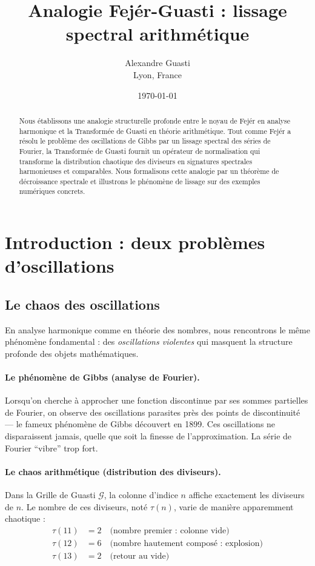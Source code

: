 \documentclass[12pt,a4paper]{article}
\title{Analogie Fejér-Guasti : lissage spectral arithmétique}
\author{Alexandre Guasti \\ \small Lyon, France}
\date{\today}
\theoremstyle{definition}
\theoremstyle{remark}
\newcommand{\GrilleG}{\mathcal{G}}           %
\begin{document}
\maketitle

\begin{abstract}
Nous établissons une analogie structurelle profonde entre le noyau de Fejér en analyse harmonique et la Transformée de Guasti en théorie arithmétique. Tout comme Fejér a résolu le problème des oscillations de Gibbs par un lissage spectral des séries de Fourier, la Transformée de Guasti fournit un opérateur de normalisation qui transforme la distribution chaotique des diviseurs en signatures spectrales harmonieuses et comparables. Nous formalisons cette analogie par un théorème de décroissance spectrale et illustrons le phénomène de lissage sur des exemples numériques concrets.
\end{abstract}

\tableofcontents
\newpage

\section{Introduction : deux problèmes d'oscillations}

\subsection{Le chaos des oscillations}

En analyse harmonique comme en théorie des nombres, nous rencontrons le même phénomène fondamental : des \emph{oscillations violentes} qui masquent la structure profonde des objets mathématiques.

\paragraph{Le phénomène de Gibbs (analyse de Fourier).}
Lorsqu'on cherche à approcher une fonction discontinue par ses sommes partielles de Fourier, on observe des oscillations parasites près des points de discontinuité — le fameux phénomène de Gibbs découvert en 1899. Ces oscillations ne disparaissent jamais, quelle que soit la finesse de l'approximation. La série de Fourier ``vibre'' trop fort.

\paragraph{Le chaos arithmétique (distribution des diviseurs).}
Dans la Grille de Guasti $\GrilleG$, la colonne d'indice $n$ affiche exactement les diviseurs de $n$. Le nombre de ces diviseurs, noté $\tau(n)$, varie de manière apparemment chaotique :
\begin{align*}
\tau(11) &= 2 \quad \text{(nombre premier : colonne vide)} \\
\tau(12) &= 6 \quad \text{(nombre hautement composé : explosion)} \\
\tau(13) &= 2 \quad \text{(retour au vide)}
\end{align*}
\end{document}
